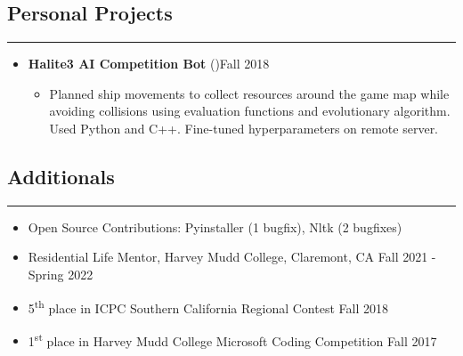 \documentclass[10pt,letterpaper]{article}
\begin{document}
\subsection*{Personal Projects}
\vspace{-0.5em}
\hrule
\vspace{1em}
  \begin{itemize}[label={},leftmargin=*]
    \setlength\itemsep{1em}
    \parskip=-0.2em
    \item
    {\textbf{Halite3 AI Competition Bot} (\href{https://github.com/ssantichaivekin/halite3}
    {})\hfill {Fall 2018}}
    \begin{itemize}[label=\textbullet]
      \itemsep0em
        \item  Planned ship movements to collect resources around the game map while avoiding collisions using evaluation functions and evolutionary algorithm. Used Python and C++. Fine-tuned hyperparameters on remote server.
    \end{itemize}
  \end{itemize}


\subsection*{Additionals}
\vspace{-0.2em}
\hrule
\vspace{1em}
  \begin{itemize}[label={},leftmargin=*]
    \setlength\itemsep{0.3em}
    \parskip=-0.2em
    \item
    Open Source Contributions: Pyinstaller (1 bugfix), Nltk (2 bugfixes)
    \item
    Residential Life Mentor, Harvey Mudd College, Claremont, CA \hfill Fall 2021 - Spring 2022
    \item
    5\textsuperscript{th} place in ICPC Southern California Regional Contest \hfill Fall 2018
    \item
    1\textsuperscript{st} place in Harvey Mudd College Microsoft Coding Competition \hfill
    Fall 2017
  \end{itemize}
\end{document}

